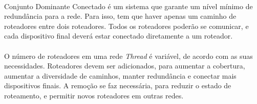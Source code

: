\paragraph{} Conjunto Dominante Conectado é um sistema que garante um nível mínimo de redundância para a rede. Para isso, tem que haver apenas um caminho de roteadores entre dois roteadores. Todos os roteadores poderão se comunicar, e cada dispositivo final deverá estar conectado diretamente a um roteador.

\paragraph{} O número de roteadores em uma rede \textit{Thread} é variável, de acordo com as suas necessidades. Roteadores devem ser adicionados, para aumentar a cobertura, aumentar a diversidade de caminhos, manter redundância e conectar mais dispositivos finais. A remoção se faz necessária, para reduzir o estado de roteamento, e permitir novos roteadores em outras redes. 
